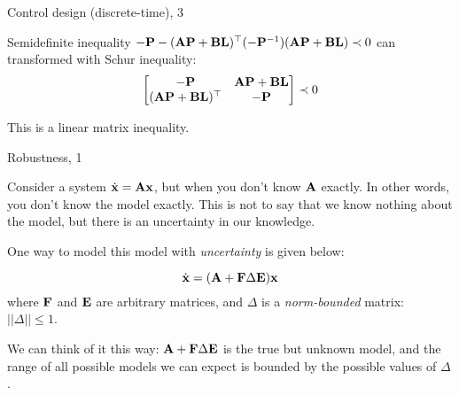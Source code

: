 \documentclass{beamer}
\begin{document}
\begin{frame}{Control design (discrete-time), 3}
	\begin{flushleft}
		
		Semidefinite inequality $-\mathbf{P} - (\mathbf{A}\mathbf{P} + \mathbf{B}\mathbf{L})^\top (-\mathbf{P}^{-1}) (\mathbf{A}\mathbf{P} + \mathbf{B}\mathbf{L})  \prec 0$ can transformed with Schur inequality:
		\begin{align}
			\begin{bmatrix}
				-\mathbf{P} & \mathbf{A}\mathbf{P} + \mathbf{B}\mathbf{L} \\
				(\mathbf{A}\mathbf{P} + \mathbf{B}\mathbf{L})^\top & -\mathbf{P}
			\end{bmatrix}  \prec 0
		\end{align}
		
		This is a linear matrix inequality.
		
	\end{flushleft}
\end{frame}




\begin{frame}{Robustness, 1}
	\begin{flushleft}
		
		Consider a system $\dot{\mathbf{x}} = \mathbf{A}\mathbf{x}$, but when you don't know $\mathbf{A}$ exactly. In other words, you don't know the model exactly. This is not to say that we know nothing about the model, but there is an uncertainty in our knowledge.
		
		\bigskip
		
		One way to model this model with \emph{uncertainty} is given below:
		
		\begin{equation}
			\label{eq:uncertain}
			\dot{\mathbf{x}} = (\mathbf{A} + \mathbf{F} \Delta \mathbf{E})\mathbf{x}
		\end{equation}
		where $\mathbf{F}$ and $\mathbf{E}$ are arbitrary matrices, and $\Delta$ is a \emph{norm-bounded} matrix: $||\Delta|| \leq 1$.
		
		\bigskip
		
		We can think of it this way: $\mathbf{A} + \mathbf{F} \Delta \mathbf{E}$ is the true but unknown model, and the range of all possible models we can expect is bounded by the possible values of $\Delta$.
		
	\end{flushleft}
\end{frame}
\end{document}
